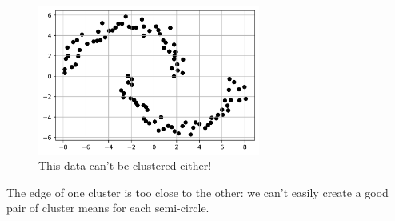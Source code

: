         \begin{figure}[h]
            \centering
            \includegraphics[width=0.65\textwidth]{images/clustering_images/offset_unclusterable.png}
            \caption*{This data can't be clustered either!}
        \end{figure}
        
        The edge of one cluster is too close to the other: we can't easily create a good pair of cluster means for each semi-circle.